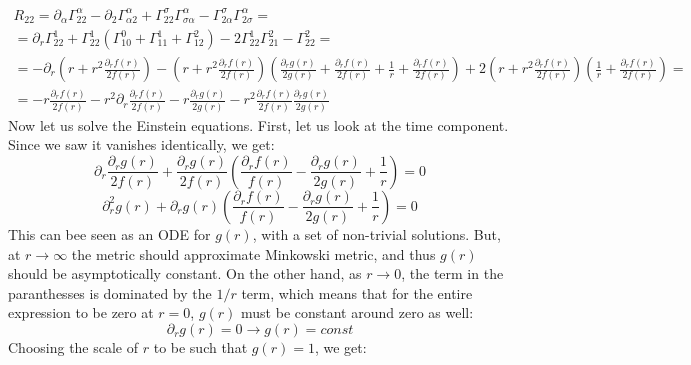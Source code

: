 \documentclass{article}
\begin{document}
\begin{equation}
\begin{gathered}
    R_{22} =
    \partial_\alpha \Gamma^\alpha_{22}
    - \partial_2 \Gamma^\alpha_{\alpha 2}
    + \Gamma^{\sigma}_{22}\Gamma^{\alpha}_{\sigma\alpha} 
    - \Gamma^{\sigma}_{2\alpha}\Gamma^{\alpha}_{2 \sigma} = \\ =
    \partial_r \Gamma^1_{22}
    + \Gamma^{1}_{22}\left(\Gamma^{0}_{10} + \Gamma^{1}_{11} + \Gamma^{2}_{12}\right) 
    - 2\Gamma^{1}_{22}\Gamma^{2}_{21}
    - \Gamma^{2}_22
    = \\ =
    - \partial_r \left(r + r^2\frac{\partial_{r}f(r)}{2f(r)}\right)
    - \left(r + r^2\frac{\partial_{r}f(r)}{2f(r)}\right)\left(\frac{\partial_{r}g(r)}{2g(r)} + \frac{\partial_r f(r)}{2f(r)} + \frac{1}{r} + \frac{\partial_r f(r)}{2f(r)}\right) 
    + 2\left(r + r^2\frac{\partial_{r}f(r)}{2f(r)}\right)\left(\frac{1}{r} + \frac{\partial_r f(r)}{2f(r)}\right)
    = \\ =
    - r\frac{\partial_r f(r)}{2f(r)}
    - r^2 \partial_r \frac{\partial_{r}f(r)}{2f(r)}
    - r\frac{\partial_{r}g(r)}{2g(r)}
    - r^2\frac{\partial_{r}f(r)}{2f(r)}\frac{\partial_{r}g(r)}{2g(r)}
\end{gathered}
\end{equation}
Now let us solve the Einstein equations. First, let us look at the time component. Since we saw it vanishes identically, we get:
\begin{equation}
    \partial_r \frac{\partial_{r}g(r)}{2f(r)}
    + \frac{\partial_{r}g(r)}{2f(r)}\left(\frac{\partial_r f(r)}{f(r)} - \frac{\partial_{r}g(r)}{2g(r)} + \frac{1}{r}\right) = 0
\end{equation}
\begin{equation}
    \partial_{r}^2 g(r)
    + \partial_{r}g(r)\left(\frac{\partial_r f(r)}{f(r)} - \frac{\partial_{r}g(r)}{2g(r)} + \frac{1}{r}\right) = 0
\end{equation}
This can bee seen as an ODE for $g(r)$, with a set of non-trivial solutions. But, at $r \rightarrow \infty$ the metric should approximate Minkowski metric, and thus $g(r)$ should be asymptotically constant. On the other hand, as $r \rightarrow 0$, the term in the paranthesses is dominated by the $1/r$ term, which means that for the entire expression to be zero at $r = 0$, $g(r)$ must be constant around zero as well:
\begin{equation}
    \partial_r g(r) = 0 \rightarrow g(r) = const
\end{equation}
Choosing the scale of $r$ to be such that $g(r) = 1$, we get:
\end{document}
